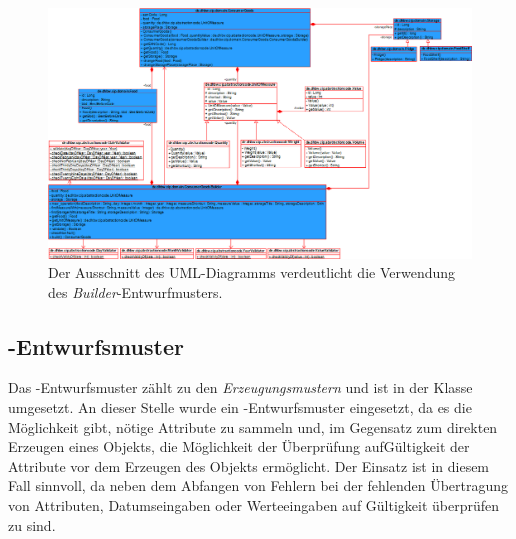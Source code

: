  \begin{figure}[H]
 	\centering
 	\includegraphics[width=1.0\textwidth]{Bilder/uml-diagramme/entwurfsmuster-builder.png}
 	\caption[Ausschnitt des UML-Diagramms zur Darstellung des \textit{Builder}-Entwurfmusters.]{Der Ausschnitt des UML-Diagramms verdeutlicht die Verwendung des \textit{Builder}-Entwurfmusters.}
 	\label{fig:uml-builder-pattern}
 \end{figure}

\subsection*{-Entwurfsmuster}
Das -Entwurfsmuster zählt zu den \textit{Erzeugungsmustern} und ist in der Klasse \href{https://github.com/lucasmerkel/dhbw-advancedswe-programmentwurf/blob/d5c89113d12c3b877ddc4d6a99225b277ddd468f/swe_programmentwurf/consumergoods-inventory-planner/3-cip-domain/src/main/java/de/dhbw/cip/domain/ConsumerGoods.java#L72}{} umgesetzt.
An dieser Stelle wurde ein -Entwurfsmuster eingesetzt, da es die Möglichkeit gibt, nötige Attribute zu sammeln und, im Gegensatz zum direkten Erzeugen eines Objekts, die Möglichkeit der Überprüfung aufGültigkeit der Attribute vor dem Erzeugen des Objekts ermöglicht.
Der Einsatz ist in diesem Fall sinnvoll, da neben dem Abfangen von Fehlern bei der fehlenden Übertragung von Attributen, Datumseingaben oder Werteeingaben auf Gültigkeit überprüfen zu sind.

